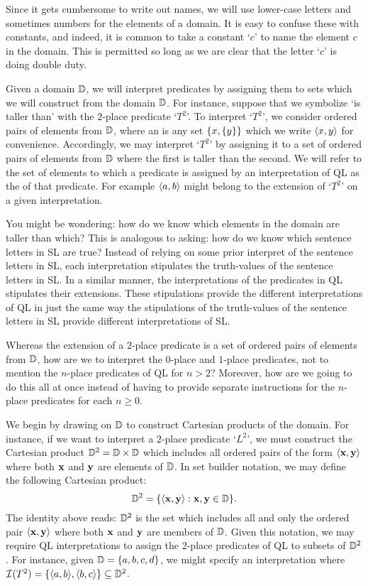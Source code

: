 Since it gets cumbersome to write out names, we will use lower-case letters and sometimes numbers for the elements of a domain.
It is easy to confuse these with constants, and indeed, it is common to take a constant `$c$' to name the element $c$ in the domain.
This is permitted so long as we are clear that the letter `$c$' is doing double duty.

Given a domain $\mathbb{D}$, we will interpret predicates by assigning them to sets which we will construct from the domain $\mathbb{D}$.
For instance, suppose that we symbolize `is taller than' with the $2$-place predicate `$T^2$'.
To interpret `$T^2$', we consider ordered pairs of elements from $\mathbb{D}$, where an  is any set $\lbrace x,\lbrace y\rbrace\rbrace$ which we write $\langle x,y\rangle$ for convenience. 
Accordingly, we may interpret `$T^2$' by assigning it to a set of ordered pairs of elements from $\mathbb{D}$ where the first is taller than the second.
We will refer to the set of elements to which a predicate is assigned by an interpretation of QL as the  of that predicate.
For example $\langle a,b\rangle$ might belong to the extension of `$T^2$' on a given interpretation. 

You might be wondering: how do we know which elements in the domain are taller than which?
This is analogous to asking: how do we know which sentence letters in SL are true?
Instead of relying on some prior interpret of the sentence letters in SL, each interpretation stipulates the truth-values of the sentence letters in SL.
In a similar manner, the interpretations of the predicates in QL stipulates their extensions.
These stipulations provide the different interpretations of QL in just the same way the stipulations of the truth-values of the sentence letters in SL provide different interpretations of SL.

Whereas the extension of a $2$-place predicate is a set of ordered pairs of elements from $\mathbb{D}$, how are we to interpret the $0$-place and $1$-place predicates, not to mention the $n$-place predicates of QL for $n>2$?
Moreover, how are we going to do this all at once instead of having to provide separate instructions for the $n$-place predicates for each $n\geq 0$.

We begin by drawing on $\mathbb{D}$ to construct Cartesian products of the domain.
For instance, if we want to interpret a $2$-place predicate `$L^2$', we must construct the Cartesian product $\mathbb{D}^2=\mathbb{D}\times\mathbb{D}$ which includes all ordered pairs of the form $\langle\mathbf{x},\mathbf{y}\rangle$ where both $\mathbf{x}$ and $\mathbf{y}$ are elements of $\mathbb{D}$.
In set builder notation, we may define the following Cartesian product: 
  $$ \mathbb{D}^2 = \lbrace\langle\mathbf{x},\mathbf{y}\rangle:\mathbf{x},\mathbf{y}\in\mathbb{D}\rbrace. $$
The identity above reads: $\mathbb{D}^2$ is the set which includes all and only the ordered pair $\langle\mathbf{x},\mathbf{y}\rangle$ where both $\mathbf{x}$ and $\mathbf{y}$ are members of $\mathbb{D}$. 
Given this notation, we may require QL interpretations to assign the $2$-place predicates of QL to subsets of $\mathbb{D}^2$. 
For instance, given $\mathbb{D}=\lbrace a,b,c,d\rbrace$, we might specify an interpretation where $\mathcal{I}(T^2)=\lbrace\langle a,b\rangle,\langle b,c\rangle\rbrace\subseteq\mathbb{D}^2$.

